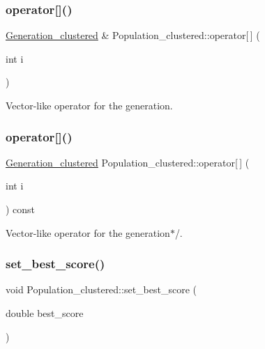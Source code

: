 \subsubsection{\texorpdfstring{operator[]()}{operator[]()}\hspace{0.1cm}{\footnotesize\ttfamily [1/2]}}
{\footnotesize\ttfamily \hyperlink{class_generation__clustered}{Generation\+\_\+clustered} \& Population\+\_\+clustered\+::operator\mbox{[}$\,$\mbox{]} (\begin{DoxyParamCaption}\item[{int}]{i }\end{DoxyParamCaption})}



Vector-\/like operator for the generation. 

\mbox{\label{class_population__clustered_a147b765cff555d4c3e779bfc44e1a7f7}} 
\subsubsection{\texorpdfstring{operator[]()}{operator[]()}\hspace{0.1cm}{\footnotesize\ttfamily [2/2]}}
{\footnotesize\ttfamily \hyperlink{class_generation__clustered}{Generation\+\_\+clustered} Population\+\_\+clustered\+::operator\mbox{[}$\,$\mbox{]} (\begin{DoxyParamCaption}\item[{int}]{i }\end{DoxyParamCaption}) const}



Vector-\/like operator for the generation$\ast$/. 

\mbox{\label{class_population__clustered_aad565e8b33c7db54d69a8d59623eea2b}} 
\subsubsection{\texorpdfstring{set\+\_\+best\+\_\+score()}{set\_best\_score()}}
{\footnotesize\ttfamily void Population\+\_\+clustered\+::set\+\_\+best\+\_\+score (\begin{DoxyParamCaption}\item[{double}]{best\+\_\+score }\end{DoxyParamCaption})}



